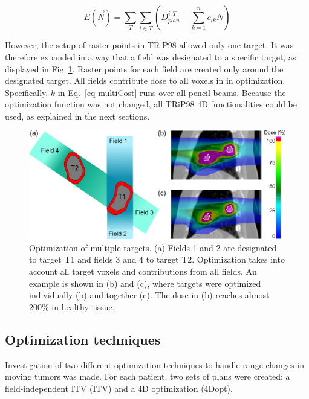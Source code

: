 \begin{equation}
\label{eq-multiCost}
 E(\vec{N}) = \sum_{T} \sum_{i\in T} \left( D_{plan}^{i,T} -\sum_{k=1}^n c_{ik}N\right)
\end{equation}

However, the setup of raster points in TRiP98 allowed only one target. It was therefore expanded in a way that a field was designated to a specific target, as displayed in Fig~\ref{Fig:multiTargets}. 
Raster points for each field are created only around the designated target. All fields contribute dose to all voxels in in optimization. Specifically, $k$ in Eq.~\ref{eq-multiCost} runs over all pencil beams. 
Because the optimization function was not changed, 
all TRiP98 4D functionalities could be used, as explained in the next sections.




\newpage


\begin{figure}[H]
	\begin{center}
		\includegraphics[width=1\textwidth]{./ComplexPatients/Images/multiTarget.png}
		\caption{Optimization of multiple targets. (a) Fields 1 and 2 are designated to target T1 and fields 3 and 4 to target T2. 
		Optimization takes into account all target voxels and contributions from all fields. An example is shown in (b) and (c), where targets
		were optimized individually (b) and together (c). The dose in (b) reaches almost 200\% in healthy tissue.}
		\label{Fig:multiTargets}
	\end{center}
\end{figure}



\subsection{Optimization techniques}

Investigation of two different optimization techniques to handle range changes in moving tumors was made. For each patient, two sets of plans were created: a field-independent ITV (ITV) and a 4D optimization (4Dopt). 

